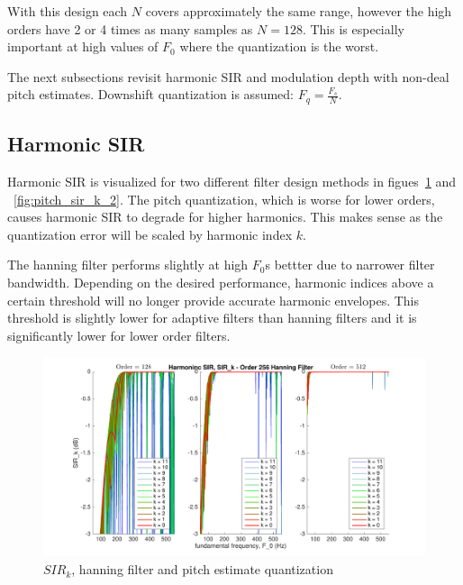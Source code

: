 \documentclass [11pt, proquest,oneside] {ganter_thesis}[2015/03/03]
\begin{document}
With this design each $N$ covers approximately the same range, however the high orders have 2 or 4 times as many samples as $N = 128$.  This is especially important at high values of $F_0$ where the quantization is the worst.

The next subsections revisit harmonic SIR and modulation depth with non-deal pitch estimates.  Downshift quantization is assumed: $F_q = \frac{F_s}{N}$.

\subsection{Harmonic SIR}

Harmonic SIR is visualized for two different filter design methods in figues~\ref{fig:pitch_sir_k_1} and ~\ref{fig:pitch_sir_k_2}.  The pitch quantization, which is worse for lower orders, causes harmonic SIR to degrade for higher harmonics.  This makes sense as the quantization error will be scaled by harmonic index $k$.

The hanning filter performs slightly at high $F_0$s bettter due to narrower filter bandwidth.  Depending on the desired performance, harmonic indices above a certain threshold will no longer provide accurate harmonic envelopes.  This threshold is slightly lower for adaptive filters than hanning filters and it is significantly lower for lower order filters.

\begin{figure}[!ht]
  \centering
    \includegraphics[width=1\textwidth]{pitch_sir_k_1}
    \caption{$SIR_k$, hanning filter and pitch estimate quantization}\label{fig:pitch_sir_k_1}
\end{figure}
\end{document}
